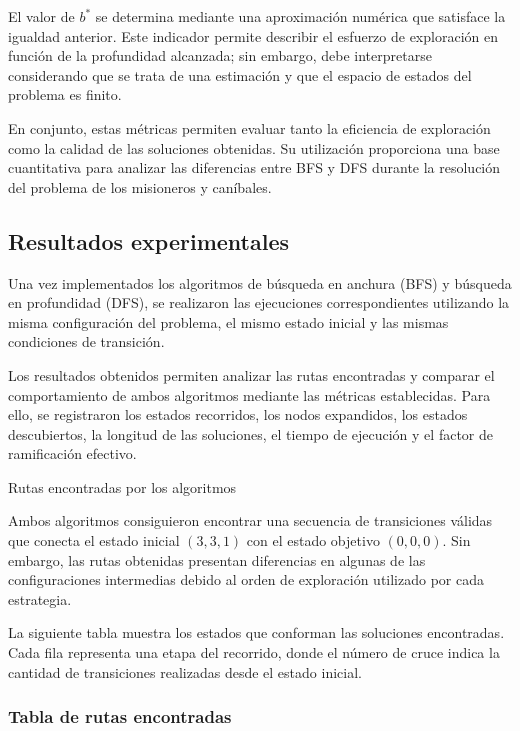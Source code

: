 \documentclass[
  spanish,
]{llncs}
\begin{document}
El valor de \(b^*\) se determina mediante una aproximación numérica que
satisface la igualdad anterior. Este indicador permite describir el
esfuerzo de exploración en función de la profundidad alcanzada; sin
embargo, debe interpretarse considerando que se trata de una estimación
y que el espacio de estados del problema es finito.

En conjunto, estas métricas permiten evaluar tanto la eficiencia de
exploración como la calidad de las soluciones obtenidas. Su utilización
proporciona una base cuantitativa para analizar las diferencias entre
BFS y DFS durante la resolución del problema de los misioneros y
caníbales.

\subsection{Resultados experimentales}\label{resultados-experimentales}

Una vez implementados los algoritmos de búsqueda en anchura (BFS) y
búsqueda en profundidad (DFS), se realizaron las ejecuciones
correspondientes utilizando la misma configuración del problema, el
mismo estado inicial y las mismas condiciones de transición.

Los resultados obtenidos permiten analizar las rutas encontradas y
comparar el comportamiento de ambos algoritmos mediante las métricas
establecidas. Para ello, se registraron los estados recorridos, los
nodos expandidos, los estados descubiertos, la longitud de las
soluciones, el tiempo de ejecución y el factor de ramificación efectivo.

Rutas encontradas por los algoritmos

Ambos algoritmos consiguieron encontrar una secuencia de transiciones
válidas que conecta el estado inicial \((3,3,1)\) con el estado objetivo
\((0,0,0)\). Sin embargo, las rutas obtenidas presentan diferencias en
algunas de las configuraciones intermedias debido al orden de
exploración utilizado por cada estrategia.

La siguiente tabla muestra los estados que conforman las soluciones
encontradas. Cada fila representa una etapa del recorrido, donde el
número de cruce indica la cantidad de transiciones realizadas desde el
estado inicial.

\subsubsection{Tabla de rutas
encontradas}\label{tabla-de-rutas-encontradas}
\end{document}
